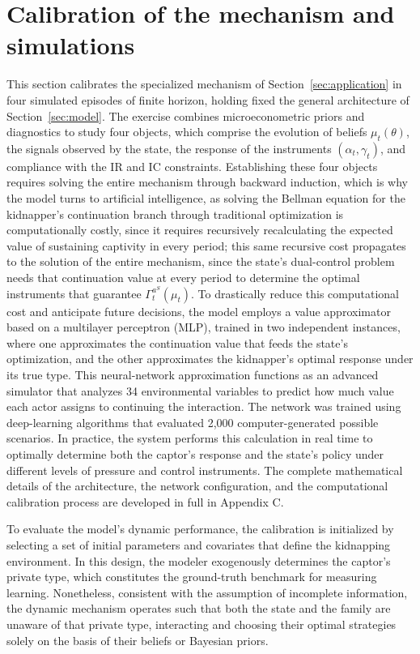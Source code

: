 \documentclass[review,authoryear,12pt]{elsarticle}
\theoremstyle{plain}
\theoremstyle{definition}
\newcommand{\1}{\mathbf{1}}
\begin{document}
\section{Calibration of the mechanism and simulations}\label{sec:calibracion}
\normalfont\normalsize
This section calibrates the specialized mechanism of Section~\ref{sec:application} in four simulated episodes of finite horizon, holding fixed the general architecture of Section~\ref{sec:model}. The exercise combines microeconometric priors and diagnostics to study four objects, which comprise the evolution of beliefs $\mu_t(\theta)$, the signals observed by the state, the response of the instruments $(\alpha_t,\gamma_t)$, and compliance with the IR and IC constraints. Establishing these four objects requires solving the entire mechanism through backward induction, which is why the model turns to artificial intelligence, as solving the Bellman equation for the kidnapper's continuation branch through traditional optimization is computationally costly, since it requires recursively recalculating the expected value of sustaining captivity in every period; this same recursive cost propagates to the solution of the entire mechanism, since the state's dual-control problem needs that continuation value at every period to determine the optimal instruments that guarantee $\Gamma_t^{a^S}(\mu_t)$. To drastically reduce this computational cost and anticipate future decisions, the model employs a value approximator based on a multilayer perceptron (MLP), trained in two independent instances, where one approximates the continuation value that feeds the state's optimization, and the other approximates the kidnapper's optimal response under its true type. This neural-network approximation functions as an advanced simulator that analyzes 34 environmental variables to predict how much value each actor assigns to continuing the interaction. The network was trained using deep-learning algorithms that evaluated 2,000 computer-generated possible scenarios. In practice, the system performs this calculation in real time to optimally determine both the captor's response and the state's policy under different levels of pressure and control instruments. The complete mathematical details of the architecture, the network configuration, and the computational calibration process are developed in full in Appendix C.

To evaluate the model's dynamic performance, the calibration is initialized by selecting a set of initial parameters and covariates that define the kidnapping environment. In this design, the modeler exogenously determines the captor's private type, which constitutes the ground-truth benchmark for measuring learning. Nonetheless, consistent with the assumption of incomplete information, the dynamic mechanism operates such that both the state and the family are unaware of that private type, interacting and choosing their optimal strategies solely on the basis of their beliefs or Bayesian priors.
\end{document}
